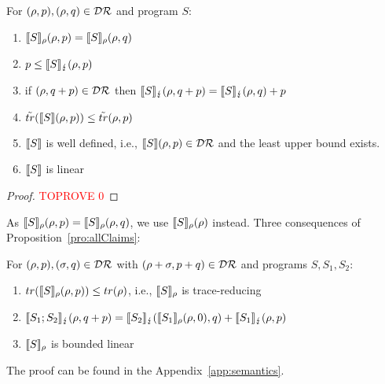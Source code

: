 \documentclass[a4paper,UKenglish,cleveref, autoref, thm-restate]{lipics-v2021}
\begin{document}
\begin{proposition}
    \label{pro:allClaims}
    For $(\rho,p), (\rho,q )\in \mathcal{D}\mathcal{R}$ and program $S$:
    \begin{enumerate}
        \item $\llbracket S \rrbracket_{\rho}(\rho,p) = \llbracket S \rrbracket_{\rho}(\rho,q)$
        \item $p \leq\llbracket S \rrbracket_{\lightning}(\rho,p)$
        \item if $(\rho,q+p)\in \mathcal{D}\mathcal{R}$ then $\llbracket S \rrbracket_{\lightning}(\rho,q+p) = \llbracket S \rrbracket_{\lightning}(\rho,q) + p$
        \item $\tilde{tr}(\llbracket S \rrbracket(\rho,p))\leq \tilde{tr}(\rho,p)$
        \item $\llbracket S \rrbracket$ is well defined, i.e., $\llbracket S \rrbracket(\rho,p) \in \mathcal{D}\mathcal{R}$ and the least upper bound exists.
        \item $\llbracket S \rrbracket$ is linear
    \end{enumerate}
\end{proposition}
\begin{proof}\textcolor{red}{TOPROVE 0}\end{proof}
As $\llbracket S \rrbracket_{\rho}(\rho,p) = \llbracket S \rrbracket_{\rho}(\rho,q)$, we use $\llbracket S \rrbracket_{\rho}(\rho)$ instead.
Three consequences of Proposition~\ref{pro:allClaims}:
\begin{lemma}
    \label{lem:bounded}
 For $(\rho,p), (\sigma,q) \in \mathcal{D}\mathcal{R}$ with $(\rho+\sigma,p+q) \in \mathcal{D}\mathcal{R}$ and programs $S, S_1, S_2$:
 \begin{enumerate}
    \item $tr(\llbracket S \rrbracket_{\rho}(\rho,p))\leq tr(\rho)$, i.e., $\llbracket S \rrbracket_{\rho}$ is trace-reducing
    \item $\llbracket S_1;S_2 \rrbracket_{\lightning} (\rho,q+p) =
        \llbracket S_2 \rrbracket_{\lightning}(\llbracket S_1 \rrbracket_{\rho}(\rho,0),q) + \llbracket S_1 \rrbracket_{\lightning}(\rho,p)$
    \item $\llbracket S \rrbracket_{\rho}$ is bounded linear
 \end{enumerate}
\end{lemma}
The proof can be found in the Appendix~\ref{app:semantics}.
\end{document}
